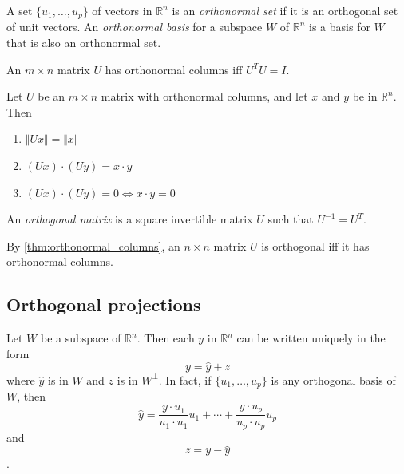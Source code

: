 \documentclass{article}
\begin{document}
\begin{defn}
    A set \(\{u_1, \ldots, u_p\}\) of vectors in \(\mathbb{R}^n\) is an \emph{orthonormal set} if it is an orthogonal set of unit vectors. An \emph{orthonormal basis} for a subspace \(W\) of \(\mathbb{R}^n\) is a basis for \(W\) that is also an orthonormal set.
\end{defn}

\begin{thm} \label{thm:orthonormal_columns}
    An \(m\times n\) matrix \(U\) has orthonormal columns iff \(U^T U=I\).
\end{thm} 

\begin{thm}
    Let \(U\) be an \(m\times n\) matrix with orthonormal columns, and let \(x\) and \(y\) be in \(\mathbb{R}^n\). Then
    \begin{enumerate}
        \item[a.] \(\Vert Ux \Vert = \Vert x \Vert\)
        \item[b.] \((Ux)\cdot(Uy) = x\cdot y\)
        \item[c.] \((Ux)\cdot(Uy) = 0 \iff x\cdot y = 0\)
    \end{enumerate}
\end{thm}

\begin{defn}
    An \emph{orthogonal matrix} is a square invertible matrix \(U\) such that \(U^{-1} = U^T\).
\end{defn}

\begin{cor}
    By \eqref{thm:orthonormal_columns}, an \(n\times n\) matrix \(U\) is orthogonal iff it has orthonormal columns.
\end{cor}

\subsection{Orthogonal projections}

\begin{thm} 
    Let \(W\) be a subspace of \(\mathbb{R}^n\). Then each \(y\) in \(\mathbb{R}^n\) can be written uniquely in the form \[y=\hat{y}+z\] where \(\hat{y}\) is in \(W\) and \(z\) is in \(W^{\perp}\). In fact, if \(\{u_1,\ldots,u_p\}\) is any orthogonal basis of \(W\), then \[\hat{y}=\frac{y\cdot u_1}{u_1\cdot u_1}u_1+\cdots+\frac{y\cdot u_p}{u_p\cdot u_p}u_p\] and \[z=y-\hat{y}\].
\end{thm}
\end{document}
